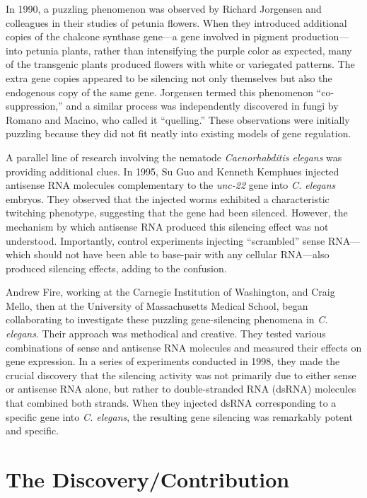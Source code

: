 In 1990, a puzzling phenomenon was observed by Richard Jorgensen and colleagues in their studies of petunia flowers. When they introduced additional copies of the chalcone synthase gene---a gene involved in pigment production---into petunia plants, rather than intensifying the purple color as expected, many of the transgenic plants produced flowers with white or variegated patterns. The extra gene copies appeared to be silencing not only themselves but also the endogenous copy of the same gene. Jorgensen termed this phenomenon ``co-suppression,'' and a similar process was independently discovered in fungi by Romano and Macino, who called it ``quelling.'' These observations were initially puzzling because they did not fit neatly into existing models of gene regulation.

A parallel line of research involving the nematode \textit{Caenorhabditis elegans} was providing additional clues. In 1995, Su Guo and Kenneth Kemphues injected antisense RNA molecules complementary to the \textit{unc-22} gene into \textit{C. elegans} embryos. They observed that the injected worms exhibited a characteristic twitching phenotype, suggesting that the gene had been silenced. However, the mechanism by which antisense RNA produced this silencing effect was not understood. Importantly, control experiments injecting ``scrambled'' sense RNA---which should not have been able to base-pair with any cellular RNA---also produced silencing effects, adding to the confusion.

Andrew Fire, working at the Carnegie Institution of Washington, and Craig Mello, then at the University of Massachusetts Medical School, began collaborating to investigate these puzzling gene-silencing phenomena in \textit{C. elegans}. Their approach was methodical and creative. They tested various combinations of sense and antisense RNA molecules and measured their effects on gene expression. In a series of experiments conducted in 1998, they made the crucial discovery that the silencing activity was not primarily due to either sense or antisense RNA alone, but rather to double-stranded RNA (dsRNA) molecules that combined both strands. When they injected dsRNA corresponding to a specific gene into \textit{C. elegans}, the resulting gene silencing was remarkably potent and specific.

\section{The Discovery/Contribution}

